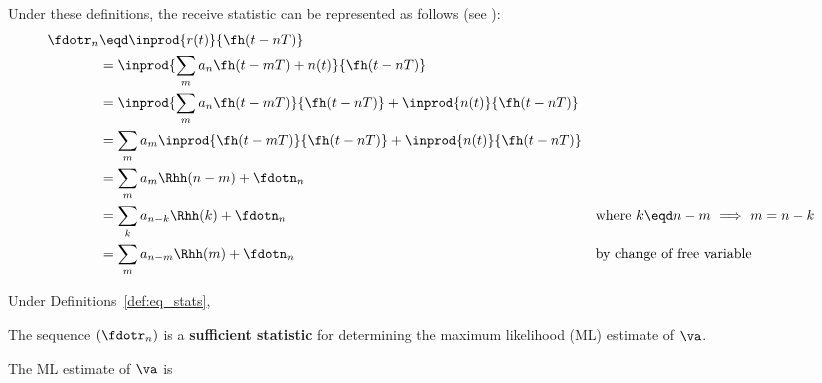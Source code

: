 \begin{definition}
\label{def:eq_stats}
\end{definition}

Under these definitions, the receive statistic can be represented as follows
(see ):
\begin{align*}
   \fdotr_n
     &\eqd \inprod{r(t)}{\fh(t-nT)}
   \\&=    \inprod{\sum_m a_n \fh(t-mT) + n(t)}{\fh(t-nT)}
   \\&=    \inprod{\sum_m a_n \fh(t-mT)}{\fh(t-nT)} + \inprod{n(t)}{\fh(t-nT)}
   \\&=    \sum_m a_m \inprod{\fh(t-mT)}{\fh(t-nT)} + \inprod{n(t)}{\fh(t-nT)}
   \\&=    \sum_m a_m \Rhh(n-m) + \fdotn_n
   \\&=    \sum_k a_{n-k} \Rhh(k) + \fdotn_n
     && \text{where $k\eqd n-m$ $\implies$ $m=n-k$}
   \\&=    \sum_m a_{n-m} \Rhh(m) + \fdotn_n
     && \text{by change of free variable}
\end{align*}
\begin{theorem}
\label{thm:eq-ml}
Under Definitions~\ref{def:eq_stats},
\begin{enume}
   \item The sequence $(\fdotr_n)$ is a {\bf sufficient statistic}
         for determining the maximum likelihood (ML) estimate of $\va$.
   \item The ML estimate of $\va$ is
\end{enume}
\end{theorem}




